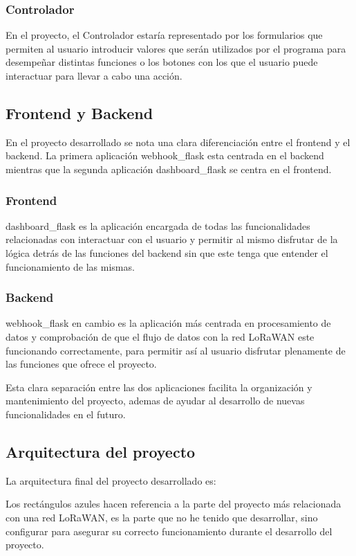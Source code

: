 \subsubsection{Controlador}
En el proyecto, el Controlador estaría representado por los formularios que permiten al usuario introducir valores que serán utilizados por el programa para desempeñar distintas funciones o los botones con los que el usuario puede interactuar para llevar a cabo una acción.

\subsection{Frontend y Backend}

En el proyecto desarrollado se nota una clara diferenciación entre el frontend y el backend. La primera aplicación webhook\_flask esta centrada en el backend mientras que la segunda aplicación dashboard\_flask se centra en el frontend.

\subsubsection{Frontend}
dashboard\_flask es la aplicación encargada de todas las funcionalidades relacionadas con interactuar con el usuario y permitir al mismo disfrutar de la lógica detrás de las funciones del backend sin que este tenga que entender el funcionamiento de las mismas.

\subsubsection{Backend}
webhook\_flask en cambio es la aplicación más centrada en procesamiento de datos y comprobación de que el flujo de datos con la red LoRaWAN este funcionando correctamente, para permitir así al usuario disfrutar plenamente de las funciones que ofrece el proyecto.

Esta clara separación entre las dos aplicaciones facilita la organización y mantenimiento del proyecto, ademas de ayudar al desarrollo de nuevas funcionalidades en el futuro.


\subsection{Arquitectura del proyecto}
La arquitectura final del proyecto desarrollado es:


Los rectángulos azules hacen referencia a la parte del proyecto más relacionada con una red LoRaWAN, es la parte que no he tenido que desarrollar, sino configurar para asegurar su correcto funcionamiento durante el desarrollo del proyecto.

